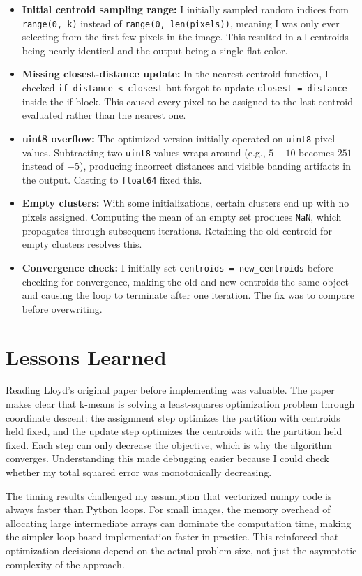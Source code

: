 \documentclass[12pt]{article}
\begin{document}
\begin{itemize}
    \item \textbf{Initial centroid sampling range:} I initially sampled random
          indices from \texttt{range(0, k)} instead of
          \texttt{range(0, len(pixels))}, meaning I was only ever selecting
          from the first few pixels in the image. This resulted in all
          centroids being nearly identical and the output being a single flat
          color.
    \item \textbf{Missing closest-distance update:} In the nearest centroid
          function, I checked \texttt{if distance < closest} but forgot to
          update \texttt{closest = distance} inside the if block. This caused
          every pixel to be assigned to the last centroid evaluated rather than
          the nearest one.
    \item \textbf{uint8 overflow:} The optimized version initially operated on
          \texttt{uint8} pixel values. Subtracting two \texttt{uint8} values
          wraps around (e.g., $5 - 10$ becomes $251$ instead of $-5$),
          producing incorrect distances and visible banding artifacts in the
          output. Casting to \texttt{float64} fixed this.
    \item \textbf{Empty clusters:} With some initializations, certain clusters
          end up with no pixels assigned. Computing the mean of an empty set
          produces \texttt{NaN}, which propagates through subsequent
          iterations. Retaining the old centroid for empty clusters resolves
          this.
    \item \textbf{Convergence check:} I initially set
          \texttt{centroids = new\_centroids} before checking for convergence,
          making the old and new centroids the same object and causing the loop
          to terminate after one iteration. The fix was to compare before
          overwriting.
\end{itemize}

\section{Lessons Learned}

Reading Lloyd's original paper before implementing was valuable. The paper
makes clear that k-means is solving a least-squares optimization problem
through coordinate descent: the assignment step optimizes the partition with
centroids held fixed, and the update step optimizes the centroids with the
partition held fixed. Each step can only decrease the objective, which is why
the algorithm converges. Understanding this made debugging easier because I
could check whether my total squared error was monotonically decreasing.

The timing results challenged my assumption that vectorized numpy code is
always faster than Python loops. For small images, the memory overhead of
allocating large intermediate arrays can dominate the computation time,
making the simpler loop-based implementation faster in practice. This
reinforced that optimization decisions depend on the actual problem size, not
just the asymptotic complexity of the approach.
\end{document}
